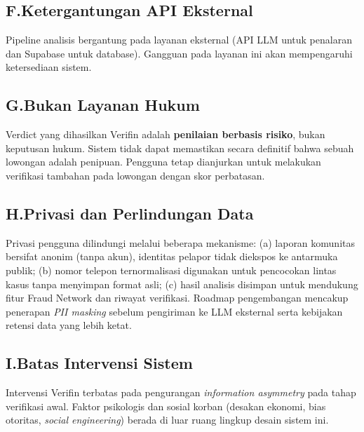 \documentclass[12pt,a4paper]{article}
\begin{document}
\begin{blokkuning}
\subsection*{F.\quad Ketergantungan API Eksternal}
Pipeline analisis bergantung pada layanan eksternal (API LLM untuk penalaran dan Supabase
untuk database). Gangguan pada layanan ini akan mempengaruhi ketersediaan sistem.

\subsection*{G.\quad Bukan Layanan Hukum}
Verdict yang dihasilkan Verifin adalah \textbf{penilaian berbasis risiko}, bukan keputusan
hukum. Sistem tidak dapat memastikan secara definitif bahwa sebuah lowongan adalah penipuan.
Pengguna tetap dianjurkan untuk melakukan verifikasi tambahan pada lowongan dengan skor
perbatasan.

\subsection*{H.\quad Privasi dan Perlindungan Data}
Privasi pengguna dilindungi melalui beberapa mekanisme: (a) laporan komunitas bersifat anonim
(tanpa akun), identitas pelapor tidak diekspos ke antarmuka publik; (b) nomor telepon
ternormalisasi digunakan untuk pencocokan lintas kasus tanpa menyimpan format asli; (c) hasil
analisis disimpan untuk mendukung fitur Fraud Network dan riwayat verifikasi. Roadmap
pengembangan mencakup penerapan \textit{PII masking} sebelum pengiriman ke LLM eksternal serta
kebijakan retensi data yang lebih ketat.

\subsection*{I.\quad Batas Intervensi Sistem}
Intervensi Verifin terbatas pada pengurangan \textit{information asymmetry} pada tahap
verifikasi awal. Faktor psikologis dan sosial korban (desakan ekonomi, bias otoritas,
\textit{social engineering}) berada di luar ruang lingkup desain sistem ini.


\end{blokkuning}
\end{document}
